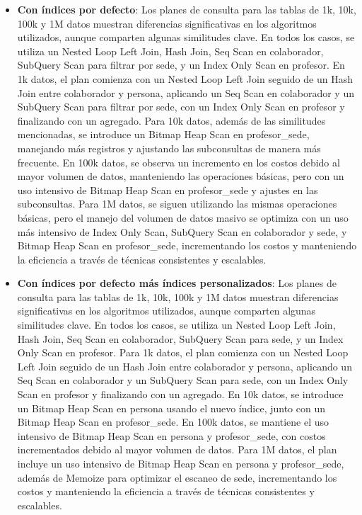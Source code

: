 \begin{itemize}
\begin{itemize}
            \item {\textbf{Con índices por defecto}: Los planes de consulta para las tablas de 1k, 10k, 100k y 1M datos muestran diferencias significativas en los algoritmos utilizados, aunque comparten algunas similitudes clave. En todos los casos, se utiliza un Nested Loop Left Join, Hash Join, Seq Scan en colaborador, SubQuery Scan para filtrar por sede, y un Index Only Scan en profesor. En 1k datos, el plan comienza con un Nested Loop Left Join seguido de un Hash Join entre colaborador y persona, aplicando un Seq Scan en colaborador y un SubQuery Scan para filtrar por sede, con un Index Only Scan en profesor y finalizando con un agregado. Para 10k datos, además de las similitudes mencionadas, se introduce un Bitmap Heap Scan en profesor\_sede, manejando más registros y ajustando las subconsultas de manera más frecuente. En 100k datos, se observa un incremento en los costos debido al mayor volumen de datos, manteniendo las operaciones básicas, pero con un uso intensivo de Bitmap Heap Scan en profesor\_sede y ajustes en las subconsultas. Para 1M datos, se siguen utilizando las mismas operaciones básicas, pero el manejo del volumen de datos masivo se optimiza con un uso más intensivo de Index Only Scan, SubQuery Scan en colaborador y sede, y Bitmap Heap Scan en profesor\_sede, incrementando los costos y manteniendo la eficiencia a través de técnicas consistentes y escalables.}
            \item {\textbf{Con índices por defecto más índices personalizados}: Los planes de consulta para las tablas de 1k, 10k, 100k y 1M datos muestran diferencias significativas en los algoritmos utilizados, aunque comparten algunas similitudes clave. En todos los casos, se utiliza un Nested Loop Left Join, Hash Join, Seq Scan en colaborador, SubQuery Scan para sede, y un Index Only Scan en profesor. Para 1k datos, el plan comienza con un Nested Loop Left Join seguido de un Hash Join entre colaborador y persona, aplicando un Seq Scan en colaborador y un SubQuery Scan para sede, con un Index Only Scan en profesor y finalizando con un agregado. En 10k datos, se introduce un Bitmap Heap Scan en persona usando el nuevo índice, junto con un Bitmap Heap Scan en profesor\_sede. En 100k datos, se mantiene el uso intensivo de Bitmap Heap Scan en persona y profesor\_sede, con costos incrementados debido al mayor volumen de datos. Para 1M datos, el plan incluye un uso intensivo de Bitmap Heap Scan en persona y profesor\_sede, además de Memoize para optimizar el escaneo de sede, incrementando los costos y manteniendo la eficiencia a través de técnicas consistentes y escalables.}
      \end{itemize}
\end{itemize}
